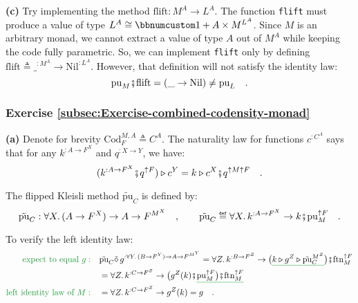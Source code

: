 \textbf{(c)} Try implementing the method $\text{flift}:M^{A}\rightarrow L^{A}$.
The function \lstinline!flift! must produce a value of type $L^{A}\cong\bbnum 1+A\times M^{L^{A}}$.
Since $M$ is an arbitrary monad, we cannot extract a value of type
$A$ out of $M^{A}$ while keeping the code fully parametric. So,
we can implement \lstinline!flift! only by defining $\text{flift}\triangleq\_^{:M^{A}}\rightarrow\text{Nil}^{:L^{A}}$.
However, that definition will not satisfy the identity law:
\[
\text{pu}_{M}\bef\text{flift}=(\_\rightarrow\text{Nil})\neq\text{pu}_{L}\quad.
\]


\subsubsection*{Exercise \ref{subsec:Exercise-combined-codensity-monad}}

\textbf{(a)} Denote for brevity $\text{Cod}_{F}^{M,A}\triangleq C^{A}$.
The naturality law for functions $c^{:C^{A}}$ says that for any $k^{:A\rightarrow F^{X}}$
and $q^{:X\rightarrow Y}$, we have:
\[
(k^{:A\rightarrow F^{X}}\bef q^{\uparrow F})\triangleright c^{Y}=k\triangleright c^{X}\bef q^{\uparrow M\uparrow F}\quad.
\]

The flipped Kleisli method $\tilde{\text{pu}}_{C}$ is defined by:
\[
\tilde{\text{pu}}_{C}:\forall X.\,(A\rightarrow F^{X})\rightarrow A\rightarrow F^{M^{X}}\quad,\quad\quad\tilde{\text{pu}}_{C}\triangleq\forall X.\,k^{:A\rightarrow F^{X}}\rightarrow k\bef\text{pu}_{M}^{\uparrow F}\quad.
\]

To verify the left identity law:
\begin{align*}
{\color{greenunder}\text{expect to equal }g:}\quad & \tilde{\text{pu}}_{C}\tilde{\diamond}\,g^{:\forall Y.\,(B\rightarrow F^{Y})\rightarrow A\rightarrow F^{M^{Y}}}=\forall Z.\,k^{:B\rightarrow F^{Z}}\rightarrow\big(\gunderline{k\triangleright g^{Z}\triangleright\tilde{\text{pu}}_{C}^{M^{Z}}}\big)\bef\text{ftn}_{M}^{\uparrow F}\\
 & =\forall Z.\,k^{:C\rightarrow F^{Z}}\rightarrow\big(g^{Z}(k)\bef\gunderline{\text{pu}_{M}^{\uparrow F}\big)\bef\text{ftn}_{M}^{\uparrow F}}\\
{\color{greenunder}\text{left identity law of }M:}\quad & =\forall Z.\,k^{:C\rightarrow F^{Z}}\rightarrow g^{Z}(k)=g\quad.
\end{align*}

